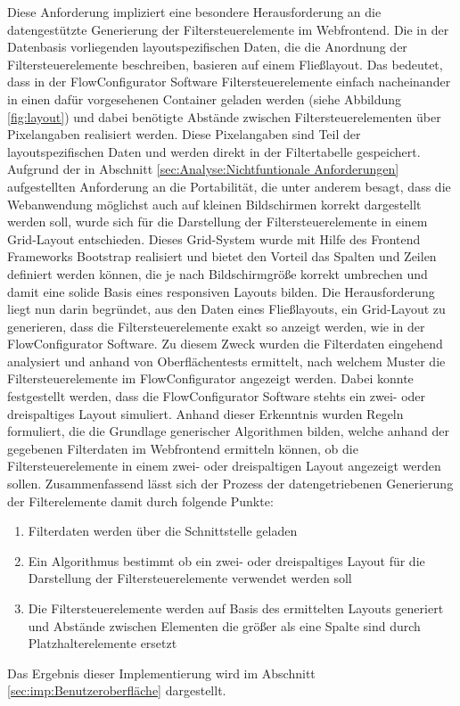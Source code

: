 Diese Anforderung impliziert eine besondere Herausforderung an die datengestützte Generierung der Filtersteuerelemente im Webfrontend. Die in der Datenbasis vorliegenden layoutspezifischen Daten, die die Anordnung der Filtersteuerelemente beschreiben, basieren auf einem Fließlayout. Das bedeutet, dass in der FlowConfigurator Software Filtersteuerelemente einfach nacheinander in einen dafür vorgesehenen Container geladen werden (siehe Abbildung \ref{fig:layout}) und dabei benötigte Abstände zwischen Filtersteuerelementen über Pixelangaben realisiert werden. Diese Pixelangaben sind Teil der layoutspezifischen Daten und werden direkt in der Filtertabelle gespeichert. Aufgrund der in Abschnitt \ref{sec:Analyse:Nichtfuntionale Anforderungen} aufgestellten Anforderung an die Portabilität, die unter anderem besagt, dass die Webanwendung möglichst auch auf kleinen Bildschirmen korrekt dargestellt werden soll, wurde sich für die Darstellung der Filtersteuerelemente in einem Grid-Layout entschieden. Dieses Grid-System wurde mit Hilfe des Frontend Frameworks Bootstrap realisiert und bietet den Vorteil das Spalten und Zeilen definiert werden können, die je nach Bildschirmgröße korrekt umbrechen und damit eine solide Basis eines responsiven Layouts bilden. Die Herausforderung liegt nun darin begründet, aus den Daten eines Fließlayouts, ein Grid-Layout zu generieren, dass die Filtersteuerelemente exakt so anzeigt werden, wie in der FlowConfigurator Software. Zu diesem Zweck wurden die Filterdaten eingehend analysiert und anhand von Oberflächentests ermittelt, nach welchem Muster die Filtersteuerelemente im FlowConfigurator angezeigt werden. Dabei konnte festgestellt werden, dass die FlowConfigurator Software stehts ein zwei- oder dreispaltiges Layout simuliert. Anhand dieser Erkenntnis wurden Regeln formuliert, die die Grundlage generischer Algorithmen bilden, welche anhand der gegebenen Filterdaten im Webfrontend ermitteln können, ob die Filtersteuerelemente in einem zwei- oder dreispaltigen Layout angezeigt werden sollen. Zusammenfassend lässt sich der Prozess der datengetriebenen Generierung der Filterelemente damit durch folgende Punkte:

\begin{enumerate}
\item Filterdaten werden über die Schnittstelle geladen
\item Ein Algorithmus bestimmt ob ein zwei- oder dreispaltiges Layout für die Darstellung der Filtersteuerelemente verwendet werden soll
\item Die Filtersteuerelemente werden auf Basis des ermittelten Layouts generiert und Abstände zwischen Elementen die größer als eine Spalte sind durch Platzhalterelemente ersetzt
\end{enumerate}
Das Ergebnis dieser Implementierung wird im Abschnitt \ref{sec:imp:Benutzeroberfläche} dargestellt.

